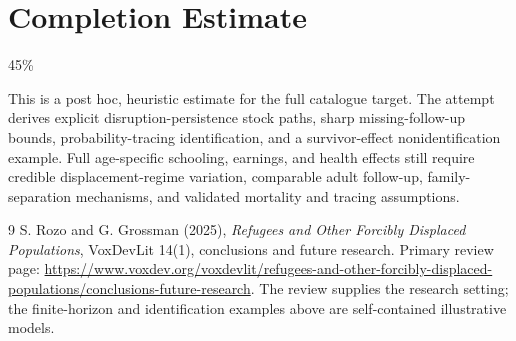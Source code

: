\documentclass[11pt,a4paper]{article}
\begin{document}
\section{Completion Estimate}
45\%

This is a post hoc, heuristic estimate for the full catalogue target.
The attempt derives explicit disruption-persistence stock paths, sharp missing-follow-up bounds, probability-tracing identification, and a survivor-effect nonidentification example. Full age-specific schooling, earnings, and health effects still require credible displacement-regime variation, comparable adult follow-up, family-separation mechanisms, and validated mortality and tracing assumptions.

\begin{thebibliography}{9}
 S. Rozo and G. Grossman (2025), \emph{Refugees and Other Forcibly Displaced Populations}, VoxDevLit 14(1), conclusions and future research. Primary review page: \url{https://www.voxdev.org/voxdevlit/refugees-and-other-forcibly-displaced-populations/conclusions-future-research}. The review supplies the research setting; the finite-horizon and identification examples above are self-contained illustrative models.
\end{thebibliography}
\end{document}
